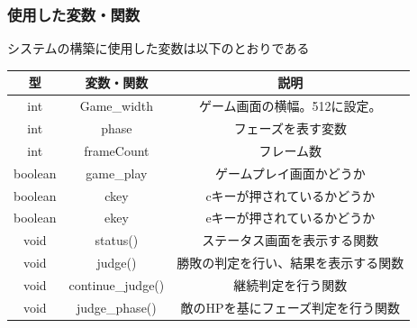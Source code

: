 \documentclass[a4paper,titlepage,11pt]{ltjsarticle}
\begin{document}
\subsubsection{使用した変数・関数}
システムの構築に使用した変数は以下のとおりである
\begin{table}[H]
	\begin{center}
		\begin{tabular}{|c|c|c|}
			\hline
			型 & 変数・関数 & 説明 \\ \hline \hline
			int & Game\_width & ゲーム画面の横幅。512に設定。 \\ \hline
			int & phase & フェーズを表す変数  \\ \hline
			int & frameCount & フレーム数 \\ \hline
			boolean & game\_play & ゲームプレイ画面かどうか \\ \hline
			boolean & ckey & cキーが押されているかどうか  \\ \hline
			boolean & ekey & eキーが押されているかどうか \\ \hline
			void & status() & ステータス画面を表示する関数 \\ \hline
			void & judge() & 勝敗の判定を行い、結果を表示する関数 \\ \hline
			void & continue\_judge() & 継続判定を行う関数 \\ \hline
			void & judge\_phase() & 敵のHPを基にフェーズ判定を行う関数 \\ \hline
		\end{tabular}
	\end{center}
\end{table}
\end{document}
